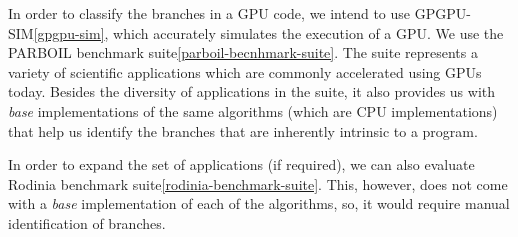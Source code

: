 
\par{In order to classify the branches in a GPU code, we intend to use GPGPU-SIM\ref{gpgpu-sim}, which accurately simulates the execution of a GPU. We use the PARBOIL benchmark suite\ref{parboil-becnhmark-suite}. The suite represents a variety of scientific applications which are commonly accelerated using GPUs today. Besides the diversity of applications in the suite, it also provides us with \textit{base} implementations of the same algorithms (which are CPU implementations) that help us identify the branches that are inherently intrinsic to a program.}

	\par{In order to expand the set of applications (if required), we can also evaluate Rodinia benchmark suite\ref{rodinia-benchmark-suite}. This, however, does not come with a \textit{base} implementation of each of the algorithms, so, it would require manual identification of branches.}
